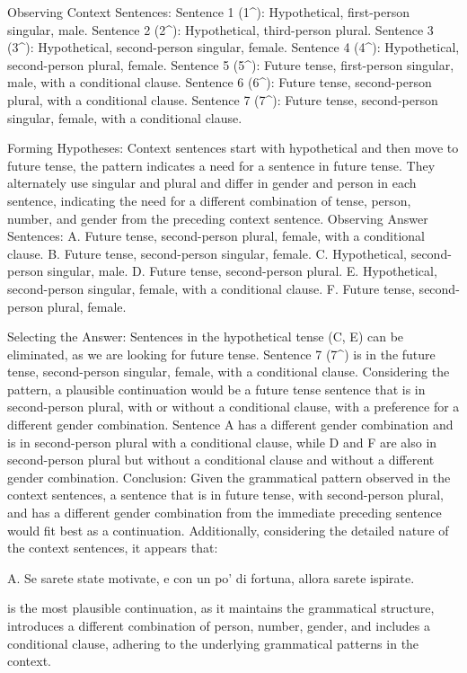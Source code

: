Observing Context Sentences:
Sentence 1 (1^): Hypothetical, first-person singular, male.
Sentence 2 (2^): Hypothetical, third-person plural.
Sentence 3 (3^): Hypothetical, second-person singular, female.
Sentence 4 (4^): Hypothetical, second-person plural, female.
Sentence 5 (5^): Future tense, first-person singular, male, with a conditional clause.
Sentence 6 (6^): Future tense, second-person plural, with a conditional clause.
Sentence 7 (7^): Future tense, second-person singular, female, with a conditional clause.

Forming Hypotheses:
Context sentences start with hypothetical and then move to future tense, the pattern indicates a need for a sentence in future tense.
They alternately use singular and plural and differ in gender and person in each sentence, indicating the need for a different combination of tense, person, number, and gender from the preceding context sentence.
Observing Answer Sentences:
A. Future tense, second-person plural, female, with a conditional clause.
B. Future tense, second-person singular, female.
C. Hypothetical, second-person singular, male.
D. Future tense, second-person plural.
E. Hypothetical, second-person singular, female, with a conditional clause.
F. Future tense, second-person plural, female.

Selecting the Answer:
Sentences in the hypothetical tense (C, E) can be eliminated, as we are looking for future tense.
Sentence 7 (7^) is in the future tense, second-person singular, female, with a conditional clause.
Considering the pattern, a plausible continuation would be a future tense sentence that is in second-person plural, with or without a conditional clause, with a preference for a different gender combination.
Sentence A has a different gender combination and is in second-person plural with a conditional clause, while D and F are also in second-person plural but without a conditional clause and without a different gender combination.
Conclusion:
Given the grammatical pattern observed in the context sentences, a sentence that is in future tense, with second-person plural, and has a different gender combination from the immediate preceding sentence would fit best as a continuation. Additionally, considering the detailed nature of the context sentences, it appears that:

A. Se sarete state motivate, e con un po' di fortuna, allora sarete ispirate.

is the most plausible continuation, as it maintains the grammatical structure, introduces a different combination of person, number, gender, and includes a conditional clause, adhering to the underlying grammatical patterns in the context.

